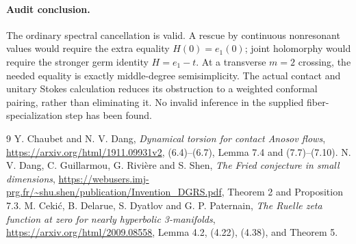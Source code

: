 \documentclass[11pt]{article}
\begin{document}
\paragraph{Audit conclusion.}
The ordinary spectral cancellation is valid. A rescue by continuous
nonresonant values would require the extra equality $H(0)=e_1(0)$;
joint holomorphy would require the stronger germ identity $H=e_1-t$.
At a transverse $m=2$ crossing, the needed equality is exactly
middle-degree semisimplicity. The actual contact and unitary Stokes
calculation reduces its obstruction to a weighted conformal pairing,
rather than eliminating it. No invalid inference in the supplied
fiber-specialization step has been found.

\begin{thebibliography}{9}
 Y. Chaubet and N. V. Dang,
\emph{Dynamical torsion for contact Anosov flows},
\url{https://arxiv.org/html/1911.09931v2},
(6.4)--(6.7), Lemma 7.4 and (7.7)--(7.10).
 N. V. Dang, C. Guillarmou, G. Rivi\`ere and S. Shen,
\emph{The Fried conjecture in small dimensions},
\url{https://webusers.imj-prg.fr/~shu.shen/publication/Invention_DGRS.pdf},
Theorem 2 and Proposition 7.3.
 M. Ceki\'c, B. Delarue, S. Dyatlov and G. P. Paternain,
\emph{The Ruelle zeta function at zero for nearly hyperbolic
3-manifolds}, \url{https://arxiv.org/html/2009.08558},
Lemma 4.2, (4.22), (4.38), and Theorem 5.
\end{thebibliography}
\end{document}

